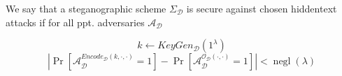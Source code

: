 \begin{definition}%
	\label{def:sec-kaptchuk}%
	We say that a steganographic scheme $\Sigma_{\mathcal{D}}$ is secure against chosen hiddentext attacks if for all ppt. adversaries $\mathcal{A}_{\mathcal{D}}$
	
	$$k \leftarrow KeyGen_{\mathcal{D}}(1^\lambda)$$
	$$\left| \mathop{Pr}\left[ \mathcal{A}_{\mathcal{D}}^{Encode_{\mathcal{D}}(k, \cdot, \cdot)}=1 \right] - \mathop{Pr}\left[ \mathcal{A}_{\mathcal{D}}^{\mathcal{O}_{\mathcal{D}}(\cdot, \cdot)}=1 \right] \right| < \mathop{negl}(\lambda)$$
\end{definition}
